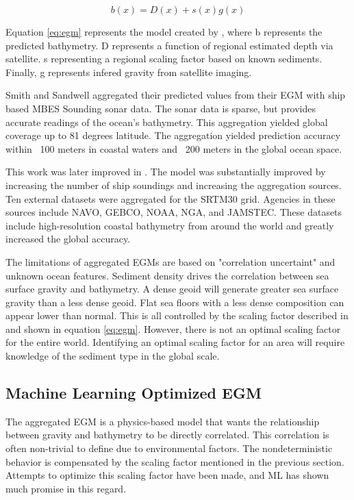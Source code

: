 \begin{equation}
    b(x) = D(x) + s(x)g(x) \label{eq:egm}
\end{equation}

\par
Equation \ref{eq:egm} represents the model created by \cite{smith1994bathymetric}, where b represents the predicted bathymetry.
D represents a function of regional estimated depth via satellite.
s representing a regional scaling factor based on known sediments.
Finally, g represents infered gravity from satellite imaging.

\par
Smith and Sandwell aggregated their predicted values from their \ac{EGM} with ship based \ac{MBES} Sounding sonar data.
The sonar data is sparse, but provides accurate readings of the ocean's bathymetry.
This aggregation yielded global coverage up to 81 degrees latitude.
The aggregation yielded prediction accuracy within ~100 meters in coastal waters and ~200 meters in the global ocean space.

\par 
This work was later improved in \cite{becker2009global}.
The model was substantially improved by increasing the number of ship soundings and increasing the aggregation sources.
Ten external datasets were aggregated for the SRTM30 grid.
Agencies in these sources include \ac{NAVO}, \ac{GEBCO}, \ac{NOAA}, \ac{NGA}, and \ac{JAMSTEC}.
These datasets include high-resolution coastal bathymetry from around the world and greatly increased the global accuracy.

\par
The limitations of aggregated \ac{EGM}s are based on "correlation uncertaint" and unknown ocean features.
Sediment density drives the correlation between sea surface gravity and bathymetry.
A dense geoid will generate greater sea surface gravity than a less dense geoid.
Flat sea floors with a less dense composition can appear lower than normal.
This is all controlled by the scaling factor described in \cite{smith1994bathymetric} and shown in equation \ref{eq:egm}. 
However, there is not an optimal scaling factor for the entire world.
Identifying an optimal scaling factor for an area will require knowledge of the sediment type in the global scale.


\subsection{Machine Learning Optimized \ac{EGM}}
The aggregated \ac{EGM} is a physics-based model that wants the relationship between gravity and bathymetry to be directly correlated.
This correlation is often non-trivial to define due to environmental factors.
The nondeterministic behavior is compensated by the scaling factor mentioned in the previous section.
Attempts to optimize this scaling factor have been made, and \ac{ML} has shown much promise in this regard.

